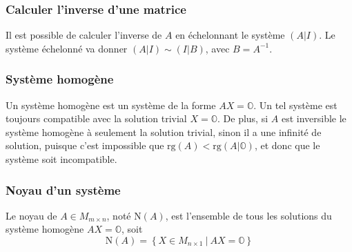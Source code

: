\subsubsection{Calculer l'inverse d'une matrice}
Il est possible de calculer l'inverse de $A$ en échelonnant le système $(A|I)$. Le
système échelonné va donner $(A|I) \sim (I|B)$, avec $B = A^{-1}$.

\subsubsection{Système homogène}
Un système homogène est un système de la forme $AX = \mathbb{O}$. Un tel système
est toujours compatible avec la solution trivial $X = \mathbb{O}$. De plus, si $A$ est inversible
le système homogène à seulement la solution trivial, sinon il a une infinité de
solution, puisque c'est impossible que $\text{rg}(A) < \text{rg}(A|\mathbb{O})$,
et donc que le système soit incompatible.

\subsubsection{Noyau d'un système}
\begin{definition}
    Le noyau de $A \in M_{m \times n}$, noté $\text{N}(A)$, est l'ensemble de tous les solutions du système homogène
    $AX = \mathbb{O}$, soit 
    \[ \text{N}(A) = \left\{ X \in M_{n \times 1} \ | \ AX = \mathbb{O}  \right\} \]
\end{definition}